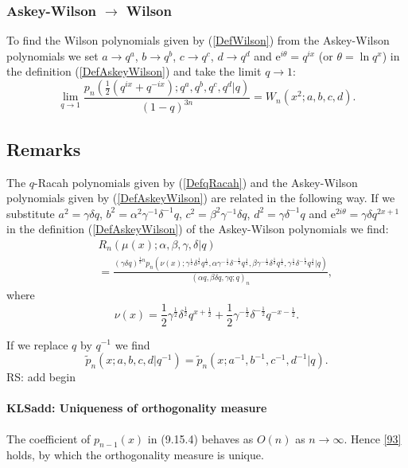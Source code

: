\documentclass[envcountchap,graybox]{svmono}
\newcounter{rom}
\newcommand{\e}{\textrm{e}}
\newcommand\iy\infty
\begin{document}
\subsubsection*{Askey-Wilson $\rightarrow$ Wilson}
To find the Wilson polynomials given by (\ref{DefWilson}) from the Askey-Wilson polynomials we
set $a\rightarrow q^a$, $b\rightarrow q^b$, $c\rightarrow q^c$, $d\rightarrow q^d$ and
$\e^{i\theta}=q^{ix}$ (or $\theta=\ln q^x$) in the definition (\ref{DefAskeyWilson}) and
take the limit $q\rightarrow 1$:
\begin{equation}
\lim_{q\rightarrow 1}\frac{p_n(\frac{1}{2}\left(q^{ix}+q^{-ix}\right);q^a,q^b,q^c,q^d|q)}{(1-q)^{3n}}=W_n(x^2;a,b,c,d).
\end{equation}

\subsection*{Remarks}
The $q$-Racah polynomials given by (\ref{DefqRacah}) and the Askey-Wilson
polynomials given by (\ref{DefAskeyWilson}) are related in the following way.
If we substitute $a^2=\gamma\delta q$, $b^2=\alpha^2\gamma^{-1}\delta^{-1}q$,
$c^2=\beta^2\gamma^{-1}\delta q$, $d^2=\gamma\delta^{-1}q$ and $\e^{2i\theta}=\gamma\delta q^{2x+1}$
in the definition (\ref{DefAskeyWilson})
of the Askey-Wilson polynomials we find:
\begin{eqnarray*}
& &R_n(\mu(x);\alpha,\beta,\gamma,\delta|q)\\
& &{}=\frac{(\gamma\delta q)^{\frac{1}{2}n}
p_n(\nu(x);\gamma^{\frac{1}{2}}\delta^{\frac{1}{2}}q^{\frac{1}{2}},
\alpha\gamma^{-\frac{1}{2}}\delta^{-\frac{1}{2}}q^{\frac{1}{2}},
\beta\gamma^{-\frac{1}{2}}\delta^{\frac{1}{2}}q^{\frac{1}{2}},
\gamma^{\frac{1}{2}}\delta^{-\frac{1}{2}}q^{\frac{1}{2}}|q)}{(\alpha q,\beta\delta q,\gamma q;q)_n},
\end{eqnarray*}
where
$$\nu(x)=\textstyle\frac{1}{2}\gamma^{\frac{1}{2}}\delta^{\frac{1}{2}}q^{x+\frac{1}{2}}
+\textstyle\frac{1}{2}\gamma^{-\frac{1}{2}}\delta^{-\frac{1}{2}}q^{-x-\frac{1}{2}}.$$

\noindent
If we replace $q$ by $q^{-1}$ we find
$${\tilde p}_n(x;a,b,c,d|q^{-1})={\tilde p}_n(x;a^{-1},b^{-1},c^{-1},d^{-1}|q).$$
 RS: add begin\label{sec9.15}
%
\paragraph{\large\bf KLSadd: Uniqueness of orthogonality measure}The coefficient of $p_{n-1}(x)$ in (9.15.4) behaves as $O(n)$ as $n\to\iy$.
Hence \eqref{93} holds, by which the orthogonality measure is unique.
%
\end{document}
